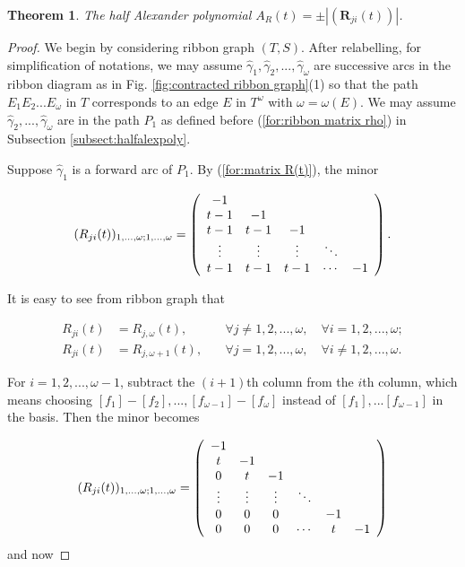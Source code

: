 \documentclass{amsart}
\newtheorem{thm}{Theorem}[subsection]
\theoremstyle{definition}
\theoremstyle{remark}
\numberwithin{equation}{subsection}
\begin{document}
\begin{thm}\label{thm:algo2}
The half Alexander polynomial $A_{R}(t)=\pm |( {\textbf{R}}_{ji} (t) )| $.
\end{thm}

\begin{proof}
We begin by considering ribbon graph $(T,S)$. After relabelling, for simplification of notations, we may assume $\hat{\gamma}_{1},\hat{\gamma}_{2},...,\hat{\gamma}_{\omega}$ are successive arcs in the ribbon diagram as in Fig. \ref{fig:contracted ribbon graph}(1) so that the path $E_{1}E_{2}...E_{\omega}$ in $T$ corresponds to an edge $E$ in $T^{\omega}$ with $\omega=\omega(E)$. We may assume $\hat{\gamma}_{2},...,\hat{\gamma}_{\omega}$ are in the path $P_{1}$ as defined before (\ref{for:ribbon matrix rho}) in Subsection \ref{subsect:halfalexpoly}.

Suppose $\hat{\gamma}_{1}$ is a forward arc of $P_{1}$. By (\ref{for:matrix R(t)}), the minor

\begin{equation}
(R_{ji}(t))_{1,...,\omega;1,...,\omega}=\left(\begin{array}[]{ccccc}
-1 & & & & \\
t-1 & -1 & & & \\
t-1 & t-1 & -1 & & \\
\vdots & \vdots & \vdots & \ddots & \\
t-1 & t-1 & t-1 & \cdots & -1
\end{array}\right).
\end{equation}

It is easy to see from ribbon graph that

\begin{align}
R_{ji}(t) &=R_{j,\omega}(t), &\quad \forall j\neq 1,2,...,\omega, \quad \forall i=1,2,...,\omega; \nonumber \\
R_{ji}(t) &=R_{j,\omega+1}(t), &\quad \forall j=1,2,...,\omega, \quad \forall i\neq 1,2,...,\omega. \label{for:Rijt 1tow rows}
\end{align}

For $i=1,2,...,\omega-1$, subtract the $(i+1)$th column from the $i$th column, which means choosing $[f_{1}]-[f_{2}],...,[f_{\omega-1}]-[f_{\omega}]$ instead of $[f_{1}],...[f_{\omega-1}]$ in the basis. Then the minor becomes

\begin{equation}
(R_{ji}(t))_{1,...,\omega;1,...,\omega}=\left(\begin{array}[]{cccccc}
-1 & & & & \\
t & -1 & & & \\
0 & t & -1 & & \\
\vdots & \vdots & \vdots & \ddots & \\
0 & 0 & 0 & & -1 \\
0 & 0 & 0 & \cdots & t & -1
\end{array}\right)
\end{equation}
and now


\end{proof}
\end{document}
